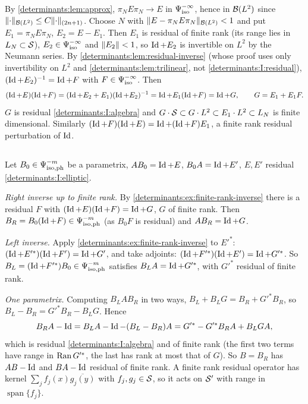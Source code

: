 By \cref{determinants:lem:approx}, $\pi_NE\pi_N\to E$ in $\Psi^{-\infty}_{\mathrm{iso}}$, hence in
$\mathcal{B}(L^2)$ since $\lVert \cdot\rVert_{\mathcal{B}(L^2)}\le C\lVert \cdot\rVert_{(2n+1)}$. Choose $N$ with
$\lVert E-\pi_NE\pi_N\rVert_{\mathcal{B}(L^2)}<1$ and put $E_1=\pi_NE\pi_N$, $E_2=E-E_1$. Then $E_1$ is
residual of finite rank (its range lies in $L_N\subset\mathcal{S}$), $E_2\in\Psi^{-\infty}_{\mathrm{iso}}$ and
$\lVert E_2\rVert<1$, so $\operatorname{Id}+E_2$ is invertible on $L^2$ by the Neumann series. By
\cref{determinants:lem:residual-inverse} (whose proof uses only invertibility on $L^2$ and
\cref{determinants:lem:trilinear}, not \ref{determinants:I:residual}), $(\operatorname{Id}+E_2)^{-1}=\operatorname{Id}+F$ with
$F\in\Psi^{-\infty}_{\mathrm{iso}}$. Then
\begin{equation*}
  (\operatorname{Id}+E)(\operatorname{Id}+F)=(\operatorname{Id}+E_2+E_1)(\operatorname{Id}+E_2)^{-1}=\operatorname{Id}+E_1(\operatorname{Id}+F)=\operatorname{Id}+G,\qquad G=E_1+E_1F .
\end{equation*}
$G$ is residual \ref{determinants:I:algebra} and $G\cdot\mathcal{S}\subset G\cdot L^2\subset E_1\cdot L^2\subset L_N$
is finite dimensional. Similarly $(\operatorname{Id}+F)(\operatorname{Id}+E)=\operatorname{Id}+(\operatorname{Id}+F)E_1$, a finite rank residual
perturbation of $\operatorname{Id}$.

\subsection*{}
Let $B_0\in\Psi^{-m}_{\mathrm{iso,ph}}$ be a parametrix, $AB_0=\operatorname{Id}+E$, $B_0A=\operatorname{Id}+E'$, $E,E'$ residual
\ref{determinants:I:elliptic}.

\emph{Right inverse up to finite rank.} By \cref{determinants:ex:finite-rank-inverse} there is a
residual $F$ with $(\operatorname{Id}+E)(\operatorname{Id}+F)=\operatorname{Id}+G$, $G$ of finite rank. Then
$B_R=B_0(\operatorname{Id}+F)\in\Psi^{-m}_{\mathrm{iso,ph}}$ (as $B_0F$ is residual) and $AB_R=\operatorname{Id}+G$.

\emph{Left inverse.} Apply \cref{determinants:ex:finite-rank-inverse} to $E'^*$: $(\operatorname{Id}+E'^*)(\operatorname{Id}+F')=\operatorname{Id}+G'$,
and take adjoints: $(\operatorname{Id}+F'^*)(\operatorname{Id}+E')=\operatorname{Id}+G'^*$. So $B_L=(\operatorname{Id}+F'^*)B_0\in\Psi^{-m}_{\mathrm{iso,ph}}$ satisfies
$B_LA=\operatorname{Id}+G'^*$, with $G'^*$ residual of finite rank.

\emph{One parametrix.} Computing $B_LAB_R$ in two ways, $B_L+B_LG=B_R+G'^*B_R$, so
$B_L-B_R=G'^*B_R-B_LG$. Hence
\begin{equation*}
  B_RA-\operatorname{Id}=B_LA-\operatorname{Id}-(B_L-B_R)A=G'^*-G'^*B_RA+B_LGA,
\end{equation*}
which is residual \ref{determinants:I:algebra} and of finite rank (the first two terms have range in
$\operatorname{Ran} G'^*$, the last has rank at most that of $G$). So $B=B_R$ has $AB-\operatorname{Id}$ and $BA-\operatorname{Id}$ residual of
finite rank. A finite rank residual operator has kernel $\sum_jf_j(x)\overline{g_j(y)}$ with
$f_j,g_j\in\mathcal{S}$, so it acts on $\mathcal{S}'$ with range in $\operatorname{span}\{f_j\}$.

